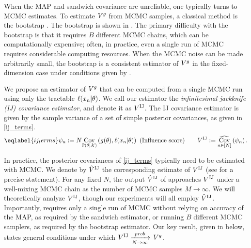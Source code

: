 When the MAP and sandwich covariance are unreliable, one typically turns to MCMC
estimates.  To estimate $V^g$ from MCMC samples, a classical method is the
bootstrap \citep{efron:1994:bootstrap,huggins:2022:bayesbag}.  The bootstrap is
shown in .  The primary difficulty with the bootstrap is that it
requires $B$ different MCMC chains, which can be computationally expensive;
often, in practice, even a single run of MCMC requires considerable computing
resources. When the MCMC noise can be made arbitrarily small, the bootstrap is a
consistent estimator of $V^g$ in the fixed-dimension case under conditions
given by \citet{huggins:2022:bayesbag}.


We propose an estimator of $V^g$ that can be
computed from a single MCMC run using only the tractable $\ell(x_n \vert
\theta)$.  We call our estimator the {\em infinitesimal jackknife (IJ)
covariance estimator}, and denote it as $V^{\mathrm{IJ}}$.  The IJ covariance estimator
is given by the sample variance of a set of simple posterior covariances, as
given in \eqref{ij_terms}.
%
    \begin{align}\eqlabel{ij_terms}
        \infl_n := N \cov{\post}{g(\theta), \ell(\x_n \vert \theta)}
        \textrm{ (Influence score)}
        \quad\quad
        \gcovij := \covhat{n \in [N]}{\infl_n}.
    \end{align}
    
In practice, the posterior covariances of \eqref{ij_terms} typically need to be
estimated with MCMC.  We denote  by $\hat{V}^{\mathrm{IJ}}$ the corresponding estimate of $V^{\mathrm{IJ}}$
(see  for a precise statement).
For any fixed $N$, the output $\hat{V}^{\mathrm{IJ}}$ of  approaches
$V^{\mathrm{IJ}}$ under a well-mixing MCMC chain as the number of MCMC samples $M
\rightarrow \infty$. We will theoretically analyze $V^{\mathrm{IJ}}$, though our
experiments will all employ $\hat{V}^{\mathrm{IJ}}$. Importantly,  requires
only a single run of MCMC without relying on accuracy of the MAP, as required by
the sandwich estimator, or running $B$ different MCMC samplers, as required by
the bootstrap estimator. Our key result, given in  below,
states general conditions under which $V^{\mathrm{IJ}} \xrightarrow[N\rightarrow\infty]{prob}\, V^g$.

